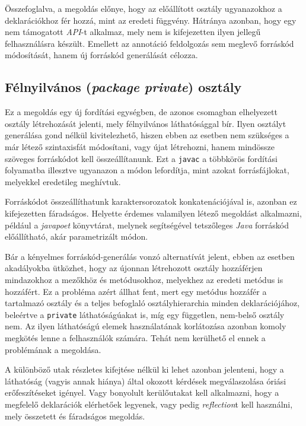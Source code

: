 Összefoglalva, a megoldás előnye, hogy az előállított osztály ugyanazokhoz a deklarációkhoz fér hozzá, mint az eredeti függvény. Hátránya azonban, hogy egy nem támogatott \textit{API}-t alkalmaz, mely nem is kifejezetten ilyen jellegű felhasználásra készült. Emellett az annotáció feldolgozás sem meglevő forráskód módosítását, hanem új forráskód generálását célozza.

\subsection{Félnyilvános (\textit{package private}) osztály}

Ez a megoldás egy új fordítási egységben, de azonos csomagban elhelyezett osztály létrehozását jelenti, mely félnyilvános láthatósággal bír. Ilyen osztályt generálása gond nélkül kivitelezhető, hiszen ebben az esetben nem szükséges a már létező szintaxisfát módosítani, vagy újat létrehozni, hanem mindössze szöveges forráskódot kell összeállítanunk. Ezt a \texttt{javac} a többkörös fordítási folyamatba illesztve ugyanazon a módon lefordítja, mint azokat forrásfájlokat, melyekkel eredetileg meghívtuk.

Forráskódot összeállíthatunk karaktersorozatok konkatenációjával is, azonban ez kifejezetten fáradságos. Helyette érdemes valamilyen létező megoldást alkalmazni, például a \textit{javapoet} könyvtárat, melynek segítségével tetszőleges \textit{Java} forráskód előállítható, akár parametrizált módon.

Bár a kényelmes forráskód-generálás vonzó alternatívát jelent, ebben az esetben akadályokba ütközhet, hogy az újonnan létrehozott osztály hozzáférjen mindazokhoz a mezőkhöz és metódusokhoz, melyekhez az eredeti metódus is hozzáfért. Ez a probléma azért állhat fent, mert egy metódus hozzáfér a tartalmazó osztály és a teljes befoglaló osztályhierarchia minden deklarációjához, beleértve a \texttt{private} láthatóságúakat is, míg egy független, nem-belső osztály nem. Az ilyen láthatóságú elemek használatának korlátozása azonban komoly megkötés lenne a felhasználók számára. Tehát nem kerülhető el ennek a problémának a megoldása.

A különböző utak részletes kifejtése nélkül ki lehet azonban jelenteni, hogy a láthatóság (vagyis annak hiánya) által okozott kérdések megválaszolása óriási erőfeszítéseket igényel. Vagy bonyolult kerülőutakat kell alkalmazni, hogy a megfelelő deklarációk elérhetőek legyenek, vagy pedig \textit{reflection}t kell használni, mely összetett és fáradságos megoldás.


